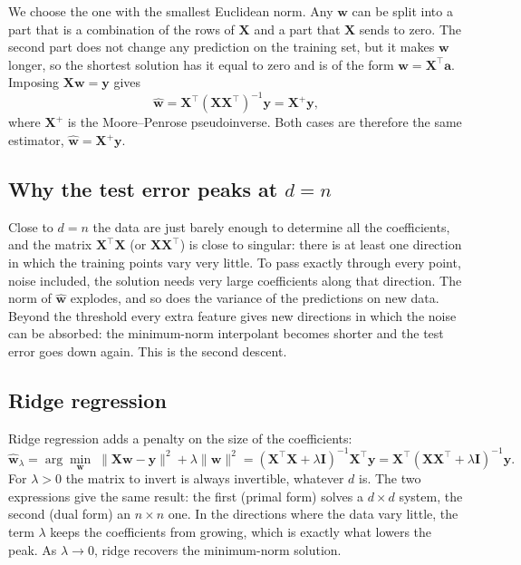 \documentclass[11pt,a4paper]{article}
\begin{document}
We choose the one with the smallest Euclidean norm. Any $\mathbf{w}$ can be
split into a part that is a combination of the rows of $\mathbf{X}$ and a
part that $\mathbf{X}$ sends to zero. The second part does not change any
prediction on the training set, but it makes $\mathbf{w}$ longer, so the
shortest solution has it equal to zero and is of the form
$\mathbf{w} = \mathbf{X}^\top \mathbf{a}$. Imposing
$\mathbf{X}\mathbf{w} = \mathbf{y}$ gives
\begin{equation}
  \hat{\mathbf{w}} = \mathbf{X}^\top (\mathbf{X} \mathbf{X}^\top)^{-1} \mathbf{y}
  = \mathbf{X}^{+} \mathbf{y} ,
  \label{eq:minnorm}
\end{equation}
where $\mathbf{X}^{+}$ is the Moore--Penrose pseudoinverse. Both cases are
therefore the same estimator, $\hat{\mathbf{w}} = \mathbf{X}^{+} \mathbf{y}$.

\subsection{Why the test error peaks at \texorpdfstring{$d = n$}{d = n}}
Close to $d = n$ the data are just barely enough to determine all the
coefficients, and the matrix $\mathbf{X}^\top \mathbf{X}$ (or
$\mathbf{X}\mathbf{X}^\top$) is close to singular: there is at least one
direction in which the training points vary very little. To pass exactly
through every point, noise included, the solution needs very large
coefficients along that direction. The norm of $\hat{\mathbf{w}}$ explodes,
and so does the variance of the predictions on new data. Beyond the
threshold every extra feature gives new directions in which the noise can
be absorbed: the minimum-norm interpolant becomes shorter and the test
error goes down again. This is the second descent.

\subsection{Ridge regression}
Ridge regression adds a penalty on the size of the coefficients:
\begin{equation}
  \hat{\mathbf{w}}_\lambda
  = \arg\min_{\mathbf{w}} \; \|\mathbf{X}\mathbf{w} - \mathbf{y}\|^2
    + \lambda \|\mathbf{w}\|^2
  = (\mathbf{X}^\top \mathbf{X} + \lambda \mathbf{I})^{-1} \mathbf{X}^\top \mathbf{y}
  = \mathbf{X}^\top (\mathbf{X} \mathbf{X}^\top + \lambda \mathbf{I})^{-1} \mathbf{y} .
\end{equation}
For $\lambda > 0$ the matrix to invert is always invertible, whatever $d$
is. The two expressions give the same result: the first (primal form)
solves a $d \times d$ system, the second (dual form) an $n \times n$ one.
In the directions where the data vary little, the term $\lambda$ keeps the
coefficients from growing, which is exactly what lowers the peak. As
$\lambda \to 0$, ridge recovers the minimum-norm solution.
\end{document}
